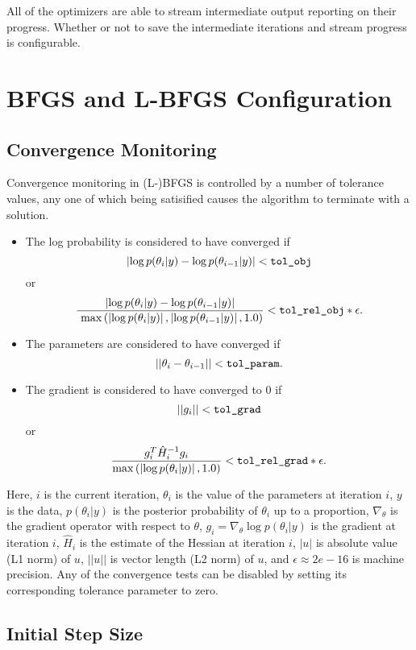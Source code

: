 All of the optimizers are able to stream intermediate output reporting
on their progress.  Whether or not to save the intermediate iterations
and stream progress is configurable.

\section{BFGS and L-BFGS Configuration}

\subsection{Convergence Monitoring}

Convergence monitoring in (L-)BFGS is controlled by a number of tolerance
values, any one of which being satisified causes the algorithm to
terminate with a solution.
%
\begin{itemize}
\item The log probability is considered to have converged if
\[
\left| \log p(\theta_{i}|y) - \log p(\theta_{i-1}|y) \right| <
\mbox{\code{tol\_obj}}
\]
or
\[
\frac{\left| \log p(\theta_{i}|y) - \log p(\theta_{i-1}|y) \right|}{\
\max\left(\left| \log p(\theta_{i}|y)\right|,\left| \log p(\theta_{i-1}|y)\right|,1.0\right)}
 < \mbox{\code{tol\_rel\_obj}} * \epsilon.
\]
\item The parameters are considered to have converged if
%
\\
\[
|| \theta_{i} - \theta_{i-1} || < \mbox{\code{tol\_param}}.
\]
%
\item The gradient is considered to have converged to 0 if 
\[
|| g_{i} || < \mbox{\code{tol\_grad}}
\]
or
\[
\frac{g_{i}^T \hat{H}_{i}^{-1} g_{i} }{ \max\left(\left|\log p(\theta_{i}|y)\right|,1.0\right) } < \mbox{\code{tol\_rel\_grad}} * \epsilon.
\]
\end{itemize}
%
Here, $i$ is the current iteration, $\theta_{i}$ is the value of the
parameters at iteration $i$, $y$ is the data, $p(\theta_{i}|y)$ is
the posterior probability of $\theta_{i}$ up to a proportion,
$\nabla_{\theta}$ is the gradient operator with respect to $\theta$,
$g_{i} = \nabla_{\theta} \log p(\theta_{i}|y)$ is the gradient at
iteration $i$, $\hat{H}_{i}$ is the estimate of the Hessian at 
iteration $i$, $|u|$ is absolute value (L1 norm) of $u$,
$||u||$ is vector length (L2 norm) of $u$, and $\epsilon \approx 2e-16$ is
machine precision.  Any of the convergence tests can be disabled
by setting its corresponding tolerance parameter to zero.

\subsection{Initial Step Size}


